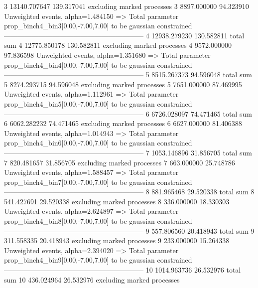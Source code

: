 3          13140.707647    139.317041      excluding marked processes    
3          8897.000000     94.323910       Unweighted events, alpha=1.484150
  => Total parameter prop_binch4_bin3[0.00,-7.00,7.00] to be gaussian constrained
------------------------------------------------------------
4          12938.279230    130.582811      total sum                     
4          12775.850178    130.582811      excluding marked processes    
4          9572.000000     97.836598       Unweighted events, alpha=1.351680
  => Total parameter prop_binch4_bin4[0.00,-7.00,7.00] to be gaussian constrained
------------------------------------------------------------
5          8515.267373     94.596048       total sum                     
5          8274.293715     94.596048       excluding marked processes    
5          7651.000000     87.469995       Unweighted events, alpha=1.112961
  => Total parameter prop_binch4_bin5[0.00,-7.00,7.00] to be gaussian constrained
------------------------------------------------------------
6          6726.028097     74.471465       total sum                     
6          6062.282232     74.471465       excluding marked processes    
6          6627.000000     81.406388       Unweighted events, alpha=1.014943
  => Total parameter prop_binch4_bin6[0.00,-7.00,7.00] to be gaussian constrained
------------------------------------------------------------
7          1053.146896     31.856705       total sum                     
7          820.481657      31.856705       excluding marked processes    
7          663.000000      25.748786       Unweighted events, alpha=1.588457
  => Total parameter prop_binch4_bin7[0.00,-7.00,7.00] to be gaussian constrained
------------------------------------------------------------
8          881.965468      29.520338       total sum                     
8          541.427691      29.520338       excluding marked processes    
8          336.000000      18.330303       Unweighted events, alpha=2.624897
  => Total parameter prop_binch4_bin8[0.00,-7.00,7.00] to be gaussian constrained
------------------------------------------------------------
9          557.806560      20.418943       total sum                     
9          311.558335      20.418943       excluding marked processes    
9          233.000000      15.264338       Unweighted events, alpha=2.394020
  => Total parameter prop_binch4_bin9[0.00,-7.00,7.00] to be gaussian constrained
------------------------------------------------------------
10         1014.963736     26.532976       total sum                     
10         436.024964      26.532976       excluding marked processes    
